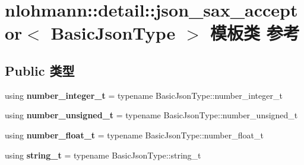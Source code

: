 \hypertarget{classnlohmann_1_1detail_1_1json__sax__acceptor}{}\section{nlohmann\+::detail\+::json\+\_\+sax\+\_\+acceptor$<$ Basic\+Json\+Type $>$ 模板类 参考}
\label{classnlohmann_1_1detail_1_1json__sax__acceptor}
\subsection*{Public 类型}
\begin{DoxyCompactItemize}
\item 
\mbox{\label{classnlohmann_1_1detail_1_1json__sax__acceptor_a41876b17c0e8bdb55580eaf5e4e2ded8}} 
using {\bfseries number\+\_\+integer\+\_\+t} = typename Basic\+Json\+Type\+::number\+\_\+integer\+\_\+t
\item 
\mbox{\label{classnlohmann_1_1detail_1_1json__sax__acceptor_ae07454608ea6f3cfb765f95e3c850043}} 
using {\bfseries number\+\_\+unsigned\+\_\+t} = typename Basic\+Json\+Type\+::number\+\_\+unsigned\+\_\+t
\item 
\mbox{\label{classnlohmann_1_1detail_1_1json__sax__acceptor_a5502f483fc60a1bcd73e0e46b6ab36e4}} 
using {\bfseries number\+\_\+float\+\_\+t} = typename Basic\+Json\+Type\+::number\+\_\+float\+\_\+t
\item 
\mbox{\label{classnlohmann_1_1detail_1_1json__sax__acceptor_a3a8078bbf865ec355106f6048241609a}} 
using {\bfseries string\+\_\+t} = typename Basic\+Json\+Type\+::string\+\_\+t
\end{DoxyCompactItemize}
